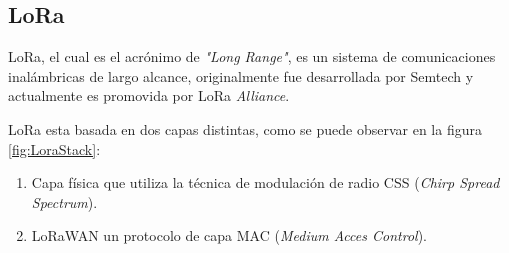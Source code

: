 \subsection{LoRa}
LoRa, el cual es el acrónimo de \textit{"Long Range"}, es un sistema de comunicaciones inalámbricas de largo alcance, originalmente fue desarrollada por Semtech y actualmente es promovida por LoRa \textit{Alliance}.

LoRa esta basada en dos capas distintas, como se puede observar en la figura \ref{fig:LoraStack}: 
\begin{enumerate}
    \item Capa física que utiliza la técnica de modulación  de radio CSS (\textit{Chirp Spread Spectrum})\cite{CSS}.
    \item LoRaWAN un protocolo de capa MAC (\textit{Medium Acces Control}).
\end{enumerate}

